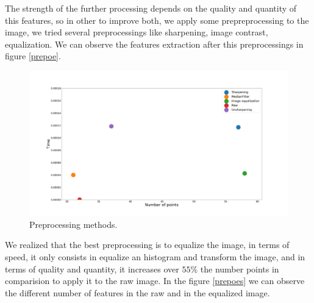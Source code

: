 \documentclass[12pt, a4paper, titlepage,twoside,openright]{article}
\begin{document}
 
The strength of the further processing depends on the quality and quantity of this features, so in other to improve both, we apply some prepreprocessing to the image, we tried several preprocessings like sharpening, image contrast, equalization. We can observe the features extraction after this preprocessings in figure \ref{prepoe}.


\begin{figure}[H]
\centering         
\includegraphics[width=0.9\linewidth]{tracker/preprocesing.png}
\caption{Preprocessing methods.} \label{track1w}
\end{figure}

We realized that the best preprocessing is to equalize the image, in terms of speed, it only consists in equalize an histogram and transform the image, and in terms of quality and quantity, it increases over $ 55 \%$ the number points in comparision to apply it to the raw image. In the figure \ref{prepoes} we can observe the different number of features in the raw and in the equalized image.
\end{document}
